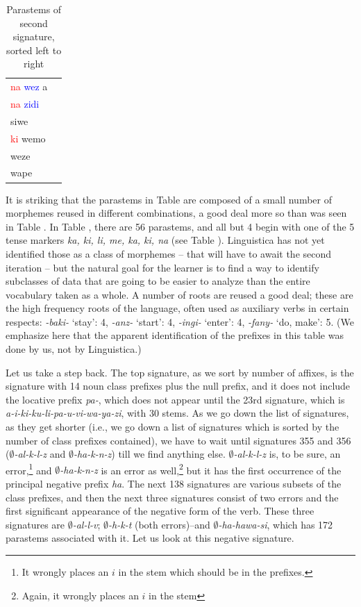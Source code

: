 \documentclass[output=paper,colorlinks,citecolor=brown,
]{langscibook}
\begin{document}
\begin{table}
\begin{minipage}[t]{.24\textwidth}
\begin{tabular}{ll}
\textcolor{red}{na} \textcolor{blue}{wez} a \\ 
\textcolor{red}{na} \textcolor{blue}{zidi} \\ 
siwe \\ 
\textcolor{red}{ki} wemo \\ 
weze \\ 
wape \\ 
\end{tabular}
\end{minipage}
\lspbottomrule
\caption{Parastems of second signature, sorted left to right}
 \label{2ndsignatureparastemsalphabetized}
\end{table}
 
It is striking that the parastems in Table  are composed of a small number of morphemes reused in different combinations, a good deal more so than was seen in Table . In Table , there are 56 parastems, and all but 4 begin with one of the 5 tense markers \textit{ka, ki, li, me, ka, ki, na} (see Table ). Linguistica has not yet identified those as a class of morphemes -- that will have to await the second iteration -- but the natural goal for the learner is to find a way to identify subclasses of data that are going to be easier to analyze than the entire vocabulary taken as a whole.  A number of roots are reused a good deal; these are the high frequency roots of the language, often used as auxiliary verbs in certain respects: \textit{-baki-} `stay': 4, \textit{-anz-} `start': 4, \textit{-ingi-} `enter': 4, \textit{-fany-} `do, make': 5. (We emphasize here that the apparent identification of the prefixes in this table was done by us, not by Linguistica.) 


Let us take a step back. The top signature, as we sort by number of affixes, is the signature with 14 noun class prefixes plus the null prefix, and it does not include the locative prefix \textit{pa-}, which does not appear until the 23rd signature, which is \textit{a-i-ki-ku-li-pa-u-vi-wa-ya-zi}, with 30 stems.  As we go down the list of signatures, as they get shorter (i.e., we go down a list of signatures which is sorted by the number of class prefixes contained), we have to wait until signatures 355 and 356 (\textit{$\emptyset$-al-k-l-z} and \textit{$\emptyset$-ha-k-n-z}) till we find anything else. \textit{$\emptyset$-al-k-l-z} is, to be sure, an error,\footnote{It wrongly places an $i$ in the stem which should be in the prefixes.} and \textit{$\emptyset$-ha-k-n-z} is an error as well,\footnote{Again, it wrongly places an $i$ in the stem} but it has the first occurrence of the principal negative prefix \textit{ha}. The next 138 signatures are various subsets of the class prefixes, and then the next three signatures consist of two errors and the first significant appearance of the negative form of the verb. These three signatures are \textit{$\emptyset$-al-l-v}; \textit{$\emptyset$-h-k-t} (both errors)--and \textit{$\emptyset$-ha-hawa-si}, which has 172 parastems associated with it. Let us look at this negative signature.
 
\end{document}
